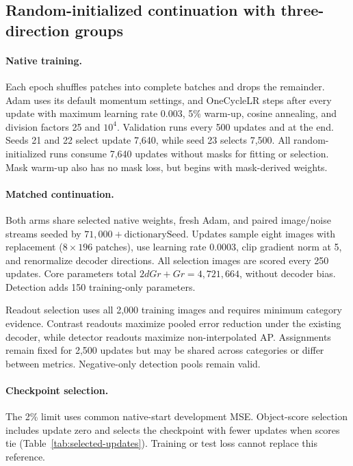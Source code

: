 \subsection{Random-initialized continuation with three-direction groups}\label{app:earlierprotocol}
\paragraph{Native training.}
Each epoch shuffles patches into complete batches and drops the remainder.
Adam uses its default momentum settings, and OneCycleLR steps after every
update with maximum learning rate 0.003, 5\% warm-up, cosine annealing, and
division factors 25 and $10^4$. Validation runs every 500 updates and at the
end. Seeds 21 and 22 select update 7,640, while seed 23 selects 7,500.
All random-initialized runs consume 7,640 updates without masks for fitting
or selection. Mask warm-up also has no mask loss, but begins with mask-derived weights.

\paragraph{Matched continuation.}
Both arms share selected native weights, fresh Adam, and paired image/noise
streams seeded by $71{,}000+\mathrm{dictionarySeed}$. Updates sample eight
images with replacement ($8\times196$ patches), use learning rate 0.0003,
clip gradient norm at 5, and renormalize decoder directions. All selection
images are scored every 250 updates. Core parameters total
$2dGr+Gr=4,721,664$, without decoder bias. Detection adds 150 training-only
parameters.

Readout selection uses all 2,000 training images and requires minimum category
evidence. Contrast readouts maximize pooled error reduction under the existing
decoder, while detector readouts maximize non-interpolated AP. Assignments
remain fixed for 2,500 updates but may be shared across categories or differ
between metrics. Negative-only detection pools remain valid.

\paragraph{Checkpoint selection.}
The 2\% limit uses common native-start development MSE. Object-score selection
includes update zero and selects the checkpoint with fewer updates when scores tie
(Table~\ref{tab:selected-updates}). Training or test loss cannot replace this reference.

